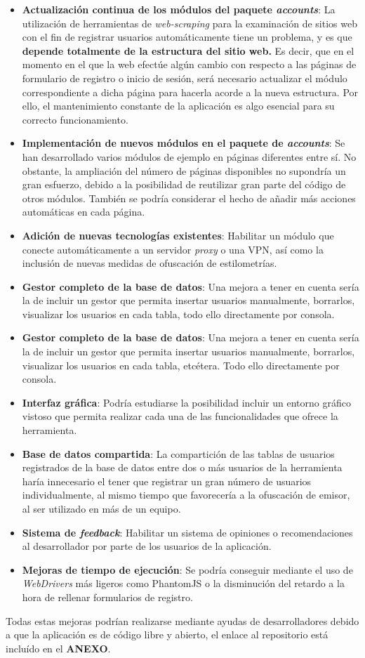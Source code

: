 \begin{itemize}
	\item \textbf{Actualización continua de los módulos del paquete \textit{accounts}}: La utilización de herramientas de \textit{web-scraping} para la examinación de sitios web con el fin de registrar usuarios automáticamente tiene un problema, y es que \textbf{depende totalmente de la estructura del sitio web.} Es decir, que en el momento en el que la web efectúe algún cambio con respecto a las páginas de formulario de registro o inicio de sesión, será necesario actualizar el módulo correspondiente a dicha página para hacerla acorde a la nueva estructura. Por ello, el mantenimiento constante de la aplicación es algo esencial para su correcto funcionamiento.
	\item \textbf{Implementación de nuevos módulos en el paquete de \textit{accounts}}: Se han desarrollado varios módulos de ejemplo en páginas diferentes entre sí. No obstante, la ampliación del número de páginas disponibles no supondría un gran esfuerzo, debido a la posibilidad de reutilizar gran parte del código de otros módulos. También se podría considerar el hecho de añadir más acciones automáticas en cada página.
	\item \textbf{Adición de nuevas tecnologías existentes}: Habilitar un módulo que conecte automáticamente a un servidor \textit{proxy} o una VPN, así como la inclusión de nuevas medidas de ofuscación de estilometrías.
	\item \textbf{Gestor completo de la base de datos}: Una mejora a tener en cuenta sería la de incluir un gestor que permita insertar usuarios manualmente, borrarlos, visualizar los usuarios en cada tabla, todo ello directamente por consola.
	\item \textbf{Gestor completo de la base de datos}: Una mejora a tener en cuenta sería la de incluir un gestor que permita insertar usuarios manualmente, borrarlos, visualizar los usuarios en cada tabla, etcétera. Todo ello directamente por consola.	
	\item \textbf{Interfaz gráfica}: Podría estudiarse la posibilidad incluir un entorno gráfico vistoso que permita realizar cada una de las funcionalidades que ofrece la herramienta.
	\item \textbf{Base de datos compartida}: La compartición de las tablas de usuarios registrados de la base de datos entre dos o más usuarios de la herramienta haría innecesario el tener que registrar un gran número de usuarios individualmente, al mismo tiempo que favorecería a la ofuscación de emisor, al ser utilizado en más de un equipo.
	\item \textbf{Sistema de \textit{feedback}}: Habilitar un sistema de opiniones o recomendaciones al desarrollador por parte de los usuarios de la aplicación.	
	\item \textbf{Mejoras de tiempo de ejecución}: Se podría conseguir mediante el uso de \textit{WebDrivers} más ligeros como PhantomJS o la disminución del retardo a la hora de rellenar formularios de registro.	
	
\end{itemize}


Todas estas mejoras podrían realizarse mediante ayudas de desarrolladores debido a que la aplicación es de código libre y abierto, el enlace al repositorio está incluído en el \textbf{ANEXO}.

\newpage \thispagestyle{empty} %